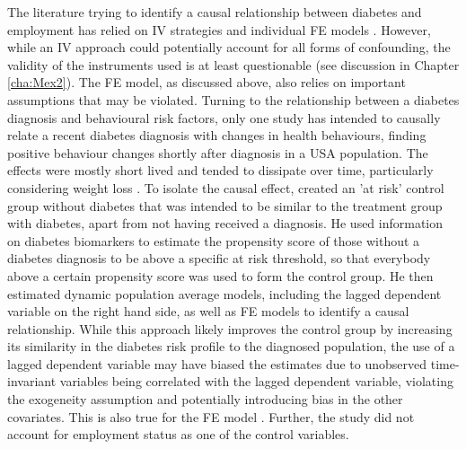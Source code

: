 The literature trying to identify a causal relationship between diabetes and employment has relied on \ac{IV} strategies \parencite{Brown2005,Latif2009,Seuring2015} and individual \ac{FE} models \parencite{Seuring2016}. However, while an \ac{IV} approach could potentially account for all forms of confounding, the validity of the instruments used is at least questionable (see discussion in Chapter \ref{cha:Mex2}). The \ac{FE} model, as discussed above, also relies on important assumptions that may be violated. Turning to the relationship between a diabetes diagnosis and behavioural risk factors, only one study has intended to causally relate a recent diabetes diagnosis with changes in health behaviours, finding positive behaviour changes shortly after diagnosis in a USA population. The effects were mostly short lived and tended to dissipate over time, particularly considering weight loss \parencite{Slade2012}. To isolate the causal effect, \textcite{Slade2012} created an 'at risk' control group without diabetes that was intended to be similar to the treatment group with diabetes, apart from not having received a diagnosis. He used information on diabetes biomarkers to estimate the propensity score of those without a diabetes diagnosis to be above a specific at risk threshold, so that everybody above a certain propensity score was used to form the control group. He then estimated dynamic population average models, including the lagged dependent variable on the right hand side, as well as \ac{FE} models to identify a causal relationship. While this approach likely improves the control group by increasing its similarity in the diabetes risk profile to the diagnosed population, the use of a lagged dependent variable may have biased the estimates due to unobserved time-invariant variables being correlated with the lagged dependent variable, violating the exogeneity assumption and potentially introducing bias in the other covariates. This is also true for the \ac{FE} model \parencite{Nickell1981,Anderson1982}. Further, the study did not account for employment status as one of the control variables. 


